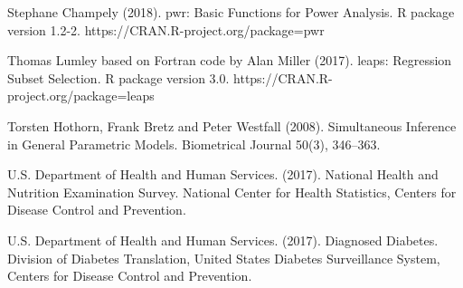 \documentclass[letter,12pt]{article}
\begin{document}
	\begin{hangparas}{.5in}{1}
		Stephane Champely (2018). pwr: Basic Functions for Power Analysis. R package version 1.2-2. https://CRAN.R-project.org/package=pwr
	\end{hangparas}
	\begin{hangparas}{.5in}{1}
	  Thomas Lumley based on Fortran code by Alan Miller (2017). leaps: Regression Subset Selection. R package version 3.0. https://CRAN.R-project.org/package=leaps
	\end{hangparas}
	\begin{hangparas}{.5in}{1}
		Torsten Hothorn, Frank Bretz and Peter Westfall (2008). Simultaneous Inference in General Parametric Models. Biometrical Journal 50(3), 346--363.
	\end{hangparas}
	\begin{hangparas}{.5in}{1}
	  U.S. Department of Health and Human Services. (2017). National Health and Nutrition Examination Survey. National Center for Health Statistics, Centers for Disease Control and Prevention.
	\end{hangparas}
	\begin{hangparas}{.5in}{1}
	  U.S. Department of Health and Human Services. (2017). Diagnosed Diabetes. Division of Diabetes Translation, United States Diabetes Surveillance System, Centers for Disease Control and Prevention.
	\end{hangparas}
\end{document}
